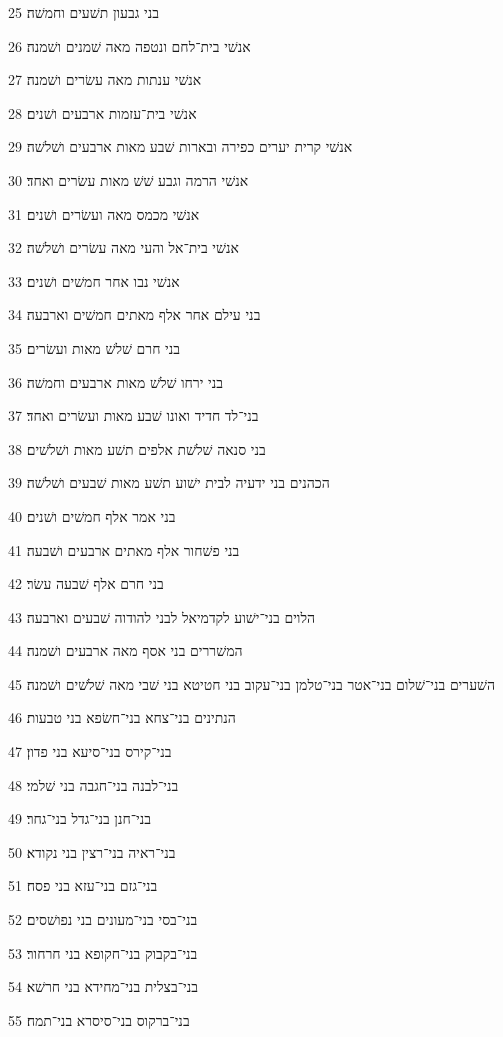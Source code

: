 \par 25 בני גבעון תשׁעים וחמשׁה׃
\par 26 אנשׁי בית־לחם ונטפה מאה שׁמנים ושׁמנה׃
\par 27 אנשׁי ענתות מאה עשׂרים ושׁמנה׃
\par 28 אנשׁי בית־עזמות ארבעים ושׁנים׃
\par 29 אנשׁי קרית יערים כפירה ובארות שׁבע מאות ארבעים ושׁלשׁה׃
\par 30 אנשׁי הרמה וגבע שׁשׁ מאות עשׂרים ואחד׃
\par 31 אנשׁי מכמס מאה ועשׂרים ושׁנים׃
\par 32 אנשׁי בית־אל והעי מאה עשׂרים ושׁלשׁה׃
\par 33 אנשׁי נבו אחר חמשׁים ושׁנים׃
\par 34 בני עילם אחר אלף מאתים חמשׁים וארבעה׃
\par 35 בני חרם שׁלשׁ מאות ועשׂרים׃
\par 36 בני ירחו שׁלשׁ מאות ארבעים וחמשׁה׃
\par 37 בני־לד חדיד ואונו שׁבע מאות ועשׂרים ואחד׃
\par 38 בני סנאה שׁלשׁת אלפים תשׁע מאות ושׁלשׁים׃
\par 39 הכהנים בני ידעיה לבית ישׁוע תשׁע מאות שׁבעים ושׁלשׁה׃
\par 40 בני אמר אלף חמשׁים ושׁנים׃
\par 41 בני פשׁחור אלף מאתים ארבעים ושׁבעה׃
\par 42 בני חרם אלף שׁבעה עשׂר׃
\par 43 הלוים בני־ישׁוע לקדמיאל לבני להודוה שׁבעים וארבעה׃
\par 44 המשׁררים בני אסף מאה ארבעים ושׁמנה׃
\par 45 השׁערים בני־שׁלום בני־אטר בני־טלמן בני־עקוב בני חטיטא בני שׁבי מאה שׁלשׁים ושׁמנה׃
\par 46 הנתינים בני־צחא בני־חשׂפא בני טבעות׃
\par 47 בני־קירס בני־סיעא בני פדון׃
\par 48 בני־לבנה בני־חגבה בני שׁלמי׃
\par 49 בני־חנן בני־גדל בני־גחר׃
\par 50 בני־ראיה בני־רצין בני נקודא׃
\par 51 בני־גזם בני־עזא בני פסח׃
\par 52 בני־בסי בני־מעונים בני נפושׁסים׃
\par 53 בני־בקבוק בני־חקופא בני חרחור׃
\par 54 בני־בצלית בני־מחידא בני חרשׁא׃
\par 55 בני־ברקוס בני־סיסרא בני־תמח׃
